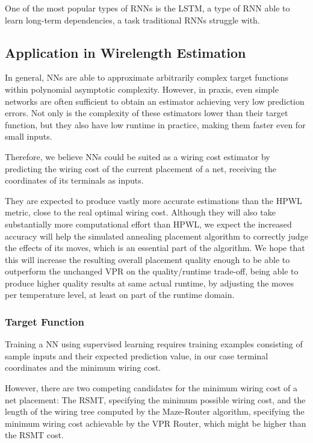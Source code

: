 One of the most popular types of \glspl{RNN} is the \gls{LSTM}\cite{lstm-paper}, a type of \gls{RNN} able to learn long-term dependencies, a task traditional \glspl{RNN} struggle with.\cite{lstm-web}

\subsection{Application in Wirelength Estimation}

In general, \glspl{NN} are able to approximate arbitrarily complex target functions\cite{universial-approx-web} within polynomial asymptotic complexity\cite{NN-complexity-web}. However, in praxis, even simple networks are often sufficient to obtain an estimator achieving very low prediction errors. Not only is the complexity of these estimators lower than their target function, but they also have low runtime in practice, making them faster even for small inputs.

Therefore, we believe \glspl{NN} could be suited as a wiring cost estimator by predicting the wiring cost of the current placement of a net, receiving the coordinates of its terminals as inputs. 

They are expected to produce vastly more accurate estimations than the \gls{HPWL} metric, close to the real optimal wiring cost. Although they will also take substantially more computational effort than \gls{HPWL}, we expect the increased accuracy will help the simulated annealing placement algorithm to correctly judge the effects of its moves, which is an essential part of the algorithm. We hope that this will increase the resulting overall placement quality enough to be able to outperform the unchanged \gls{VPR} on the quality/runtime trade-off, being able to produce higher quality results at same actual runtime, by adjusting the moves per temperature level, at least on part of the runtime domain.

\subsubsection{Target Function}

Training a \gls{NN} using supervised learning requires training examples consisting of sample inputs and their expected prediction value, in our case terminal coordinates and the minimum wiring cost.

However, there are two competing candidates for the minimum wiring cost of a net placement: The \gls{RSMT}, specifying the minimum possible wiring cost, and the length of the wiring tree computed by the Maze-Router algorithm\cite{Maze-Router}, specifying the minimum wiring cost achievable by the \gls{VPR} Router, which might be higher than the \gls{RSMT} cost.

